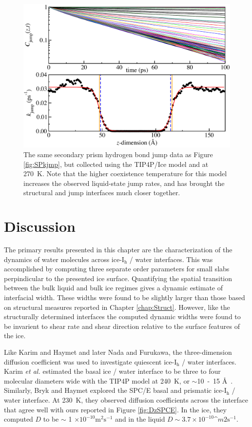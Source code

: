 \begin{figure}
\includegraphics[width=\linewidth]{Figures/secprismJumpPlotTIP4PIce}
\caption{\label{fig:SPTIP4Pkjmp} The same secondary prism hydrogen
  bond jump data as Figure \ref{fig:SPkjmp}, but collected using the
  TIP4P/Ice model and at 270~K.  Note that the higher coexistence
  temperature for this model increases the observed liquid-state jump
  rates, and has brought the structural and jump interfaces much
  closer together.}
\end{figure}


\section{Discussion}
The primary results presented in this chapter are the characterization
of the dynamics of water molecules across ice-I$_\mathrm{h}$ / water
interfaces. This was accomplished by computing three separate order
parameters for small slabs perpindicular to the presented ice
surface. Quantifying the spatial transition between the bulk liquid
and bulk ice regimes gives a dynamic estimate of interfacial
width. These widths were found to be slightly larger than those based
on structural measures reported in Chapter \ref{chap:Struct}. However,
like the structurally determined interfaces the computed dynamic
widths were found to be invarient to shear rate and shear direction
relative to the surface features of the ice. 

Like Karim and Haymet\cite{Karim1987,Karim1988} and later Nada and
Furukawa\cite{Nada1995}, the three-dimension diffusion coefficient was
used to investigate quiescent ice-I$_\mathrm{h}$ / water
interfaces. Karim \textit{et al.} estimated the basal ice / water
interface to be three to four molecular diameters wide with the TIP4P
model at 240~K, or $\sim$10~-~15 \AA~. Similarly, Bryk and Haymet
explored the SPC/E basal and prismatic ice-I$_\mathrm{h}$ / water
interface. At 230~K, they observed diffusion coefficients across the
interface that agree well with ours reported in Figure
\ref{fig:DzSPCE}. In the ice, they computed $D$ to be $\sim$ 1
$\times 10^{-10} \mathrm{m}^{2} \mathrm{s}^{-1}$ and in the liquid
$D \sim 3.7 \times 10^{-10} \mathrm^{m}{2} \mathrm{s}^{-1}$.

